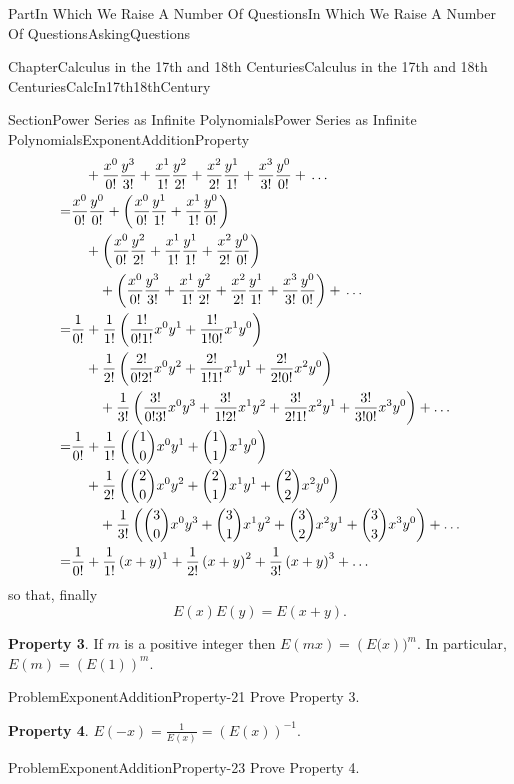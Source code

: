\documentclass[oneside,10pt,]{book}
\newcommand{\terminology}[1]{\textbf{#1}}
\numberwithin{equation}{part}
\newcommand{\amp}{&}
\begin{document}
\begin{partptx}{Part}{In Which We Raise A Number Of Questions}{}{In Which We Raise A Number Of Questions}{}{}{AskingQuestions}
\begin{chapterptx}{Chapter}{Calculus in the 17th and 18th Centuries}{}{Calculus in the 17th and 18th Centuries}{}{}{CalcIn17th18thCentury}
\begin{sectionptx}{Section}{Power Series as Infinite Polynomials}{}{Power Series as Infinite Polynomials}{}{}{ExponentAdditionProperty}
\begin{align}
\amp{}\ \ \         +\frac{x^0}{0!}\frac{y^3}{3!}+\frac{x^1}{1!}\frac{y^2}{2!}+\frac{x^2}{2!}\frac{y^1}{1!}+\frac{x^3}{3!}\frac{y^0}{0!}+\,\ldots\notag\\
=\amp\frac{x^0}{0!}\frac{y^0}{0!}+\left(\frac{x^0}{0!}\frac{y^1}{1!}+ \frac{x^1}{1!}\frac{y^0}{0!}\right)\notag\\
\amp{}\ \ \         +\left(\frac{x^0}{0!}\frac{y^2}{2!}+\frac{x^1}{1!}\frac{y^1}{1!}+\frac{x^2}{2!}\frac{y^0}{0!}\right)\notag\\
\amp{}\ \ \ \ \ \        +\left(\frac{x^0}{0!}\frac{y^3}{3!}+\frac{x^1}{1!}\frac{y^2}{2!}+\frac{x^2}{2!}\frac{y^1}{1!}+\frac{x^3}{3!}\frac{y^0}{0!}\right)+\,\ldots\notag\\
=\amp\frac{1}{0!}+\frac{1}{1!}\left(\frac{1!}{0!1!}x^0y^1+\frac{1!}{1!0!}x^1y^0\right)\notag\\
\amp{}\ \ \        +\frac{1}{2!}\left(\frac{2!}{0!2!}x^0y^2+\frac{2!}{1!1!}x^1y^1+\frac{2!}{2!0!}x^2y^0\right)\notag\\
\amp{}\ \ \ \ \ \        +\frac{1}{3!}\left(\frac{3!}{0!3!}x^0y^3+\frac{3!}{1!2!}x^1y^2+\frac{3!}{2!1!}x^2y^1+\frac{3!}{3!0!}x^3y^0\right)+\ldots\notag\\
=\amp \frac{1}{0!}+\frac{1}{1!}\left(\binom{1}{0}x^0y^1+\binom{1}{1}x^1y^0\right)\notag\\
\amp{}\ \ \        +\frac{1}{2!}\left(\binom{2}{0}x^0y^2+\binom{2}{1}x^1y^1+\binom{2}{2}x^2y^0\right)\notag\\
\amp{}\ \ \ \ \ \        +\frac{1}{3!}\left(\binom{3}{0}x^0y^3+\binom{3}{1}x^1y^2+\binom{3}{2}x^2y^1+\binom{3}{3}x^3y^0\right)+\ldots\notag\\
=\amp \frac{1}{0!}+\frac{1}{1!}\left(x+y\right)^1+\frac{1}{2!}\left(x+y\right)^2+\frac{1}{3!}\left(x+y\right)^3+\ldots\notag
\end{align}
so that, finally%
\begin{equation}
E(x)E(y) =  E(x+y)\text{.}\label{ExponentAdditionProperty-19-2}
\end{equation}
%
\par
\terminology{Property 3}. If \(m\) is a positive integer then \(E(mx)=\left(E(x\right))^m\). In particular, \(E(m)=\left(E(1)\right)^m\).%
\begin{problem}{Problem}{}{ExponentAdditionProperty-21}%
Prove Property 3.%
\end{problem}
\terminology{Property 4}. \(E(-x)=\frac{1}{E(x)}=\left(E(x)\right)^{-1}\).%
\begin{problem}{Problem}{}{ExponentAdditionProperty-23}%
Prove Property 4.%
\end{problem}

\end{sectionptx}
\end{chapterptx}
\end{partptx}
\end{document}
